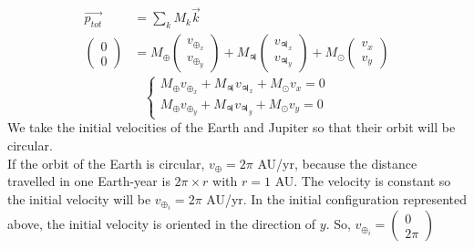\documentclass[a4paper, twoside, 11pt]{report}
\theoremstyle{theorem}
\theoremstyle{remark}
\theoremstyle{exemple}
\begin{document}
                \begin{align*}
                    \vec{p_{tot}} &= \sum\limits_{k} M_k \vec{k} \\
                    \left(\begin{array}{c}
                            0\\
                            0
                    \end{array} \right) &= M_{\oplus} 
                        \left(\begin{array}{c}
                                v_{\oplus_x}\\
                                v_{\oplus_y}
                        \end{array} \right) + M_{\jupiter}
                             \left(\begin{array}{c}
                                    v_{\jupiter_x}\\
                                    v_{\jupiter_y}
                            \end{array} \right) + M_{\odot}
                                \left(\begin{array}{c}
                                        v_x\\
                                        v_y    
                                \end{array} \right)
                \end{align*}
                \begin{equation*}
                    \left\{
                        \begin{aligned}
                            M_{\oplus} v_{\oplus_x} + M_{\jupiter} v_{\jupiter_x} + M_{\odot} v_x = 0 \\
                            M_{\oplus} v_{\oplus_y} + M_{\jupiter} v_{\jupiter_y} + M_{\odot} v_y = 0
                        \end{aligned}
                    \right.
                \end{equation*}
            We take the initial velocities of the Earth and Jupiter so that their orbit will be circular.\\
            If the orbit of the Earth is circular, $v_{\oplus} = 2 \pi $ AU/yr, because the distance travelled in one Earth-year is $2 \pi \times r$ with $r = 1$ AU. The velocity is constant so the initial velocity will be $v_{\oplus_i}=2\pi$ AU/yr. In the initial configuration represented above, the initial velocity is oriented in the direction of $y$. So, $v_{\oplus_i} = \left(\begin{array}{c}
                0\\
                2 \pi
            \end{array} \right)$ \\
\end{document}
